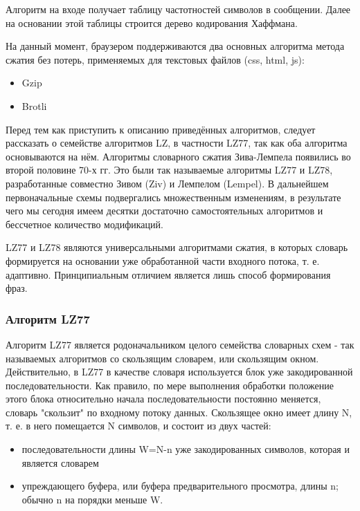 \documentclass[12pt]{article}
\begin{document}
Алгоритм на входе получает таблицу частотностей символов в сообщении.
Далее на основании этой таблицы строится дерево кодирования Хаффмана.

На данный момент, браузером поддерживаются два основных алгоритма метода сжатия без потерь, применяемых для текстовых файлов (css, html, js):

\begin{itemize}
    \item Gzip
    \item Brotli
\end{itemize}

Перед тем как приступить к описанию приведённых алгоритмов, следует рассказать
о семействе алгоритмов LZ, в частности LZ77, так как оба алгоритма основываются на нём.
Алгоритмы словарного сжатия Зива-Лемпела появились во второй половине 70-х гг.
Это были так называемые алгоритмы LZ77 и LZ78, разработанные совместно
Зивом (Ziv) и Лемпелом (Lempel). В дальнейшем первоначальные схемы подвергались множественным
изменениям, в результате чего мы сегодня имеем десятки достаточно самостоятельных алгоритмов
и бессчетное количество модификаций.

LZ77 и LZ78 являются универсальными алгоритмами сжатия,
в которых словарь формируется на основании уже обработанной части входного потока,
т. е. адаптивно. Принципиальным отличием является лишь способ формирования фраз.

\subsubsection{Алгоритм LZ77}

Алгоритм LZ77 является родоначальником целого семейства словарных схем - так называемых
алгоритмов со скользящим словарем, или скользящим окном. Действительно,
в LZ77 в качестве словаря используется блок уже закодированной последовательности.
Как правило, по мере выполнения обработки положение этого блока относительно начала
последовательности постоянно меняется, словарь "скользит" по входному потоку данных.
Скользящее окно имеет длину N, т. е. в него помещается N символов, и состоит из двух
частей:

\begin{itemize}
    \item последовательности длины W=N-n уже закодированных символов, которая и является словарем
    \item упреждающего буфера, или буфера предварительного просмотра,
          длины n; обычно n на порядки меньше W.
\end{itemize}
\end{document}
